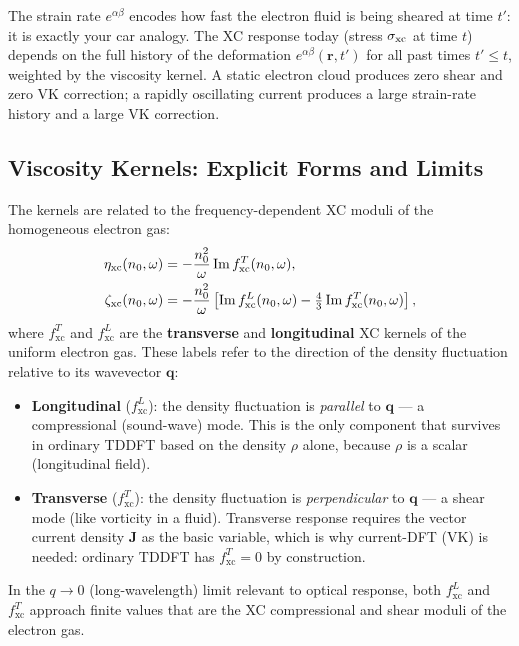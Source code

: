 \documentclass[12pt,letterpaper]{article}
\newcommand{\fxc}{f_{\mathrm{xc}}}
\theoremstyle{definition}
\begin{document}
\begin{insight}
The strain rate $e^{\alpha\beta}$ encodes how fast the electron fluid is
being sheared at time $t'$: it is exactly your car analogy.  The XC
response today (stress $\sigma_{\rm xc}$ at time $t$) depends on the
full history of the deformation $e^{\alpha\beta}(\bm{r},t')$ for all
past times $t'\leq t$, weighted by the viscosity kernel.  A static
electron cloud produces zero shear and zero VK correction; a rapidly
oscillating current produces a large strain-rate history and a large
VK correction.
\end{insight}

\subsection{Viscosity Kernels: Explicit Forms and Limits}

The kernels are related to the frequency-dependent XC moduli of the
homogeneous electron gas:
\begin{align}
  \eta_{\rm xc}(n_0,\omega)
  &= -\frac{n_0^2}{\omega}\operatorname{Im}\fxc^T(n_0,\omega),
  \label{eq:eta_xc}\\
  \zeta_{\rm xc}(n_0,\omega)
  &= -\frac{n_0^2}{\omega}\left[\operatorname{Im}\fxc^L(n_0,\omega)
     - \tfrac{4}{3}\operatorname{Im}\fxc^T(n_0,\omega)\right],
  \label{eq:zeta_xc}
\end{align}
where $\fxc^T$ and $\fxc^L$ are the \textbf{transverse} and
\textbf{longitudinal} XC kernels of the uniform electron gas.
These labels refer to the direction of the density fluctuation relative
to its wavevector $\bm{q}$:
\begin{itemize}[noitemsep]
  \item \textbf{Longitudinal} ($\fxc^L$): the density fluctuation is
    \emph{parallel} to $\bm{q}$ --- a compressional (sound-wave) mode.
    This is the only component that survives in ordinary TDDFT based
    on the density $\rho$ alone, because $\rho$ is a scalar (longitudinal
    field).
  \item \textbf{Transverse} ($\fxc^T$): the density fluctuation is
    \emph{perpendicular} to $\bm{q}$ --- a shear mode (like vorticity
    in a fluid). Transverse response requires the vector current density
    $\bm{J}$ as the basic variable, which is why current-DFT (VK) is
    needed: ordinary TDDFT has $\fxc^T = 0$ by construction.
\end{itemize}
In the $q\to 0$ (long-wavelength) limit relevant to optical response,
both $\fxc^L$ and $\fxc^T$ approach finite values that are the XC
compressional and shear moduli of the electron gas.
\end{document}
